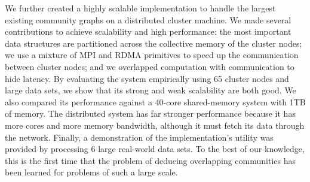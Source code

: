We further created a highly scalable implementation to handle the largest existing
community graphs on a distributed cluster machine.
We made several contributions to
achieve scalability and high performance:
the most important data structures are partitioned across the collective memory of the
cluster nodes;
we use a
mixture of MPI and RDMA primitives to speed up the communication between cluster
nodes; and
we overlapped computation
with communication to hide latency.
%
By evaluating the system empirically using 65 cluster nodes and large data sets,
we show that its strong and weak scalability are both good. We also compared its
performance against a 40-core shared-memory system with 1TB of memory.
The distributed system has far stronger performance because it has more cores and
more memory bandwidth, although it must fetch its data through the network.
Finally, a
demonstration of the implementation's utility was provided by processing 6
large real-world data sets.
To the best of
our knowledge, this is the first time that the problem of deducing overlapping
communities has been learned for problems of such a large scale.
